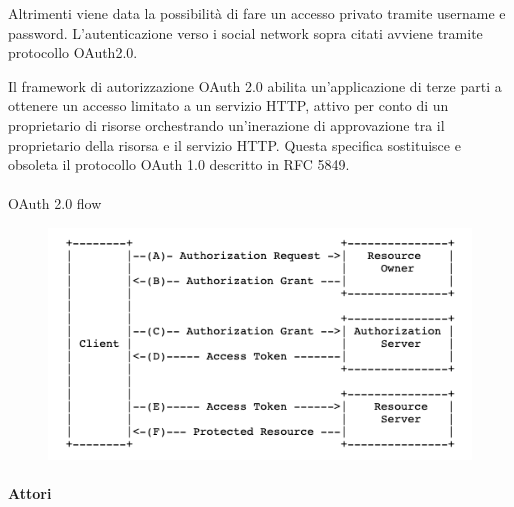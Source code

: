 Altrimenti viene data la possibilità di fare un accesso privato tramite username e password.
L'autenticazione verso i social network sopra citati avviene tramite protocollo OAuth2.0.

Il framework di autorizzazione OAuth 2.0 abilita un'applicazione di terze parti a ottenere un accesso limitato a un servizio HTTP, attivo
per conto di un proprietario di risorse orchestrando un'inerazione di approvazione tra il proprietario della risorsa e il servizio HTTP.
Questa specifica sostituisce e obsoleta il protocollo OAuth 1.0 descritto in RFC 5849.
\paragraph{}
\paragraph{}
\paragraph{}

OAuth 2.0 flow 

\begin{figure}[h!]
    \centering  
    \includegraphics[scale=0.60]{img/cap2/oauth20-1}
\end{figure}

\paragraph{}

\textbf{Attori}


